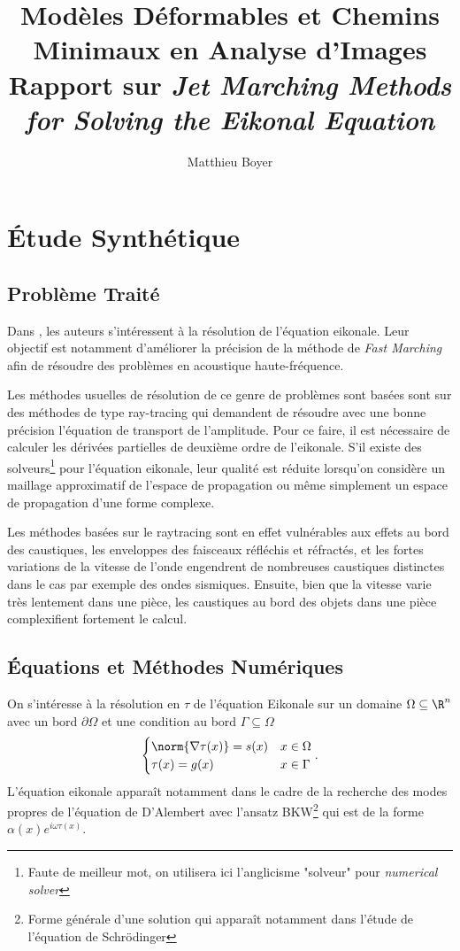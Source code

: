 \documentclass[math, info]{mpb-cours}
\title{Modèles Déformables et Chemins Minimaux en Analyse d'Images\texorpdfstring{\\ Rapport sur \textit{Jet Marching Methods for Solving the Eikonal Equation}}{}}
\author{Matthieu Boyer}
\begin{document}
\bettertitle
\newpage
\section{Étude Synthétique}

\subsection{Problème Traité}
Dans \cite{potter2021jetmarchingmethodssolving}, les auteurs s'intéressent à la résolution de l'équation
eikonale.
Leur objectif est notamment d'améliorer la précision de la méthode de \textit{Fast Marching} afin de
résoudre des problèmes en acoustique haute-fréquence.

\smallskip

Les méthodes usuelles de résolution de ce genre de problèmes sont basées sont sur des méthodes de type
ray-tracing qui demandent de résoudre avec une bonne précision l'équation de transport de l'amplitude.
Pour ce faire, il est nécessaire de calculer les dérivées partielles de deuxième ordre de l'eikonale.
S'il existe des solveurs\footnote{Faute de meilleur mot, on utilisera ici l'anglicisme "solveur" pour
	\textit{numerical solver}} pour l'équation eikonale, leur qualité est réduite lorsqu'on considère un
maillage approximatif de l'espace de propagation ou même simplement un espace de propagation d'une forme
complexe.

Les méthodes basées sur le raytracing sont en effet vulnérables aux effets au bord des caustiques, les
enveloppes des faisceaux réfléchis et réfractés, et les fortes variations de la vitesse de l'onde
engendrent de nombreuses caustiques distinctes dans le cas par exemple des ondes sismiques.
Ensuite, bien que la vitesse varie très lentement dans une pièce, les caustiques au bord des objets dans une
pièce complexifient fortement le calcul.

\subsection{Équations et Méthodes Numériques}
On s'intéresse à la résolution en $\tau$ de l'équation Eikonale sur un domaine $\Omega \subseteq \R^{n}$ avec
un bord $\partial \Omega$ et une condition au bord $\Gamma \subseteq \Omega$
\begin{equation*}
	\begin{cases}
		\norm{\nabla \tau(x)} = s(x) & x \in \Omega \\
		\tau(x) = g(x)               & x\in \Gamma
	\end{cases}.
\end{equation*}
L'équation eikonale apparaît notamment dans le cadre de la recherche des modes propres de l'équation de
D'Alembert avec l'ansatz BKW\footnote{Forme générale d'une solution qui apparaît notamment dans l'étude de
	l'équation de Schrödinger} qui est de la forme $\alpha(x)e^{i\omega \tau(x)}$.
\end{document}
